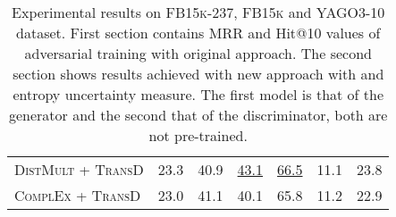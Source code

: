 \begin{table}[h]
\begin{tabular}{lllllll}
          \textsc{DistMult} + \textsc{TransD}
          & 23.3 
          & 40.9  
           & \underline{43.1} 
           & \underline{66.5}
           & 11.1
           & 23.8\\
        
         \textsc{ComplEx} + \textsc{TransD}
          & 23.0  
          & 41.1  
             & 40.1 
             & 65.8
             & 11.2
             & 22.9\\
          
        \bottomrule
    \end{tabular}
    \caption{Experimental results on \textsc{FB15k-237}, \textsc{FB15k} and \textsc{YAGO3-10} dataset.
    First section contains MRR and Hit@10 values of adversarial training with original \kbgan approach.
    The second section shows results achieved with new approach \usgan with \ussoftmax and entropy uncertainty measure.
    The first model is that of the generator and the second that of the discriminator, both are not pre-trained.}
\label{tab:result_table3}
\end{table}
